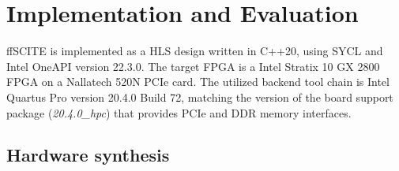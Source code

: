 \section{Implementation and Evaluation}
\label{sec:evaluation}

\ac{ffSCITE} is implemented as a \ac{HLS} design written in C++20, using SYCL and Intel OneAPI version 22.3.0. %
The target \ac{FPGA} is a Intel Stratix 10 GX 2800 \ac{FPGA} on a Nallatech 520N PCIe card. The utilized backend tool chain is Intel Quartus Pro version 20.4.0 Build 72, matching the version of the board support package (\emph{20.4.0\_hpc}) that provides PCIe and DDR memory interfaces. 

\subsection{Hardware synthesis}
\label{subsec:hardware}


